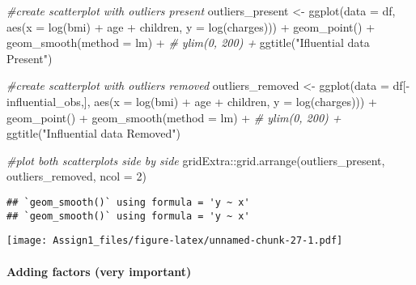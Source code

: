 \documentclass[
]{article}
\newenvironment{Shaded}{\begin{snugshade}}{\end{snugshade}}
\newcommand{\AttributeTok}[1]{\textcolor[rgb]{0.77,0.63,0.00}{#1}}
\newcommand{\CommentTok}[1]{\textcolor[rgb]{0.56,0.35,0.01}{\textit{#1}}}
\newcommand{\DecValTok}[1]{\textcolor[rgb]{0.00,0.00,0.81}{#1}}
\newcommand{\FunctionTok}[1]{\textcolor[rgb]{0.00,0.00,0.00}{#1}}
\newcommand{\NormalTok}[1]{#1}
\newcommand{\OtherTok}[1]{\textcolor[rgb]{0.56,0.35,0.01}{#1}}
\newcommand{\SpecialCharTok}[1]{\textcolor[rgb]{0.00,0.00,0.00}{#1}}
\newcommand{\StringTok}[1]{\textcolor[rgb]{0.31,0.60,0.02}{#1}}
\begin{document}
\begin{Shaded}
\begin{Highlighting}[]
\CommentTok{\#create scatterplot with outliers present}
\NormalTok{outliers\_present }\OtherTok{\textless{}{-}} \FunctionTok{ggplot}\NormalTok{(}\AttributeTok{data =}\NormalTok{ df, }\FunctionTok{aes}\NormalTok{(}\AttributeTok{x =} \FunctionTok{log}\NormalTok{(bmi) }\SpecialCharTok{+}\NormalTok{ age }\SpecialCharTok{+}\NormalTok{ children, }\AttributeTok{y =} \FunctionTok{log}\NormalTok{(charges))) }\SpecialCharTok{+}
  \FunctionTok{geom\_point}\NormalTok{() }\SpecialCharTok{+}
  \FunctionTok{geom\_smooth}\NormalTok{(}\AttributeTok{method =}\NormalTok{ lm) }\SpecialCharTok{+}
\CommentTok{\#  ylim(0, 200) +}
  \FunctionTok{ggtitle}\NormalTok{(}\StringTok{"Ifluential data Present"}\NormalTok{)}

\CommentTok{\#create scatterplot with outliers removed}
\NormalTok{outliers\_removed }\OtherTok{\textless{}{-}} \FunctionTok{ggplot}\NormalTok{(}\AttributeTok{data =}\NormalTok{ df[}\SpecialCharTok{{-}}\NormalTok{influential\_obs,], }\FunctionTok{aes}\NormalTok{(}\AttributeTok{x =} \FunctionTok{log}\NormalTok{(bmi) }\SpecialCharTok{+}\NormalTok{ age }\SpecialCharTok{+}\NormalTok{ children, }\AttributeTok{y =} \FunctionTok{log}\NormalTok{(charges))) }\SpecialCharTok{+}
  \FunctionTok{geom\_point}\NormalTok{() }\SpecialCharTok{+}
  \FunctionTok{geom\_smooth}\NormalTok{(}\AttributeTok{method =}\NormalTok{ lm) }\SpecialCharTok{+}
\CommentTok{\#  ylim(0, 200) +}
  \FunctionTok{ggtitle}\NormalTok{(}\StringTok{"Influential data Removed"}\NormalTok{)}

\CommentTok{\#plot both scatterplots side by side}
\NormalTok{gridExtra}\SpecialCharTok{::}\FunctionTok{grid.arrange}\NormalTok{(outliers\_present, outliers\_removed, }\AttributeTok{ncol =} \DecValTok{2}\NormalTok{)}
\end{Highlighting}
\end{Shaded}

\begin{verbatim}
## `geom_smooth()` using formula = 'y ~ x'
## `geom_smooth()` using formula = 'y ~ x'
\end{verbatim}

\texttt{[image: Assign1\_files/figure-latex/unnamed-chunk-27-1.pdf]}

\hypertarget{adding-factors-very-important}{%
\paragraph{Adding factors (very
important)}\label{adding-factors-very-important}}
\end{document}
